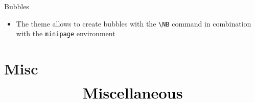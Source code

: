 \documentclass[10pt,itemsep]{beamer}
\begin{document}
\begin{frame}
    {Bubbles}
    \begin{itemize}
        \item The theme allows to create bubbles with the \texttt{\textbackslash NB} command in combination with the \texttt{minipage} environment \bigskip
    \end{itemize}
    \begin{center}
    \end{center}
    \begin{center}
    \end{center}
    \begin{center}
\end{center}
\end{frame}
\shownotesblock{}


\section{Misc}
\begin{frame}
    \begin{eqnarray*}
        &\text{{\huge \textbf{Miscellaneous}}}\\
    \end{eqnarray*}
\end{frame}
\shownotesblock{}
\end{document}
